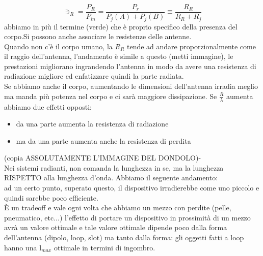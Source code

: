 \documentclass[oneside, 12pt]{extbook}
\begin{document}
\begin{itemize}
\begin{equation}
		\ni_R = \frac{P_R}{P_{in}} = \dfrac{P_r}{P_j(A) + P_j(B)} \equiv \dfrac{R_R}{R_R + R_j}
	\end{equation}
	abbiamo in più il termine (verde) che è proprio specifico della presenza del corpo.Si possono anche associare le resistenze delle antenne.\\Quando non c'è il corpo umano, la $R_R$ tende ad andare proporzionalmente come il raggio dell'antenna, l'andamento è simile a questo (metti immagine), le prestazioni migliorano ingrandendo l'antenna in modo da avere una resistenza di radiazione migliore ed enfatizzare quindi la parte radiata.\\Se abbiamo anche il corpo, aumentando le dimensioni dell'antenna irradia meglio ma manda più potenza nel corpo e ci sarà maggiore dissipazione. Se $\frac{R}{\lambda}$ aumenta abbiamo due effetti opposti:
	\begin{itemize}
		\item da una parte aumenta la resistenza di radiazione
		\item ma da una parte aumenta anche la resistenza di perdita
	\end{itemize}
	(copia ASSOLUTAMENTE L'IMMAGINE DEL DONDOLO)-\\Nei sistemi radianti, non comanda la lunghezza in se, ma la lunghezza RISPETTO alla lunghezza d'onda. Abbiamo il seguente andamento:\\ ad un certo punto, superato questo, il dispositivo irradierebbe come uno piccolo e quindi sarebbe poco efficiente.\\È un tradeoff e vale ogni volta che abbiamo un mezzo con perdite (pelle, pneumatico, etc...) l'effetto di portare un dispositivo in prossimità di un mezzo avrà un valore ottimale e tale valore ottimale dipende poco dalla forma dell'antenna (dipolo, loop, slot) ma tanto dalla forma: gli oggetti fatti a loop hanno una l$_{max}$ ottimale in termini di ingombro.

\end{itemize}
\end{document}

